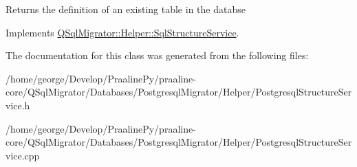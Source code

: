 \begin{DoxyReturn}{Returns}
the definition of an existing table in the databse 
\end{DoxyReturn}


Implements \hyperlink{class_q_sql_migrator_1_1_helper_1_1_sql_structure_service_abb2f11402700c1a1e52d596431255e8a}{Q\+Sql\+Migrator\+::\+Helper\+::\+Sql\+Structure\+Service}.



The documentation for this class was generated from the following files\+:\begin{DoxyCompactItemize}
\item 
/home/george/\+Develop/\+Praaline\+Py/praaline-\/core/\+Q\+Sql\+Migrator/\+Databases/\+Postgresql\+Migrator/\+Helper/Postgresql\+Structure\+Service.\+h\item 
/home/george/\+Develop/\+Praaline\+Py/praaline-\/core/\+Q\+Sql\+Migrator/\+Databases/\+Postgresql\+Migrator/\+Helper/Postgresql\+Structure\+Service.\+cpp\end{DoxyCompactItemize}
